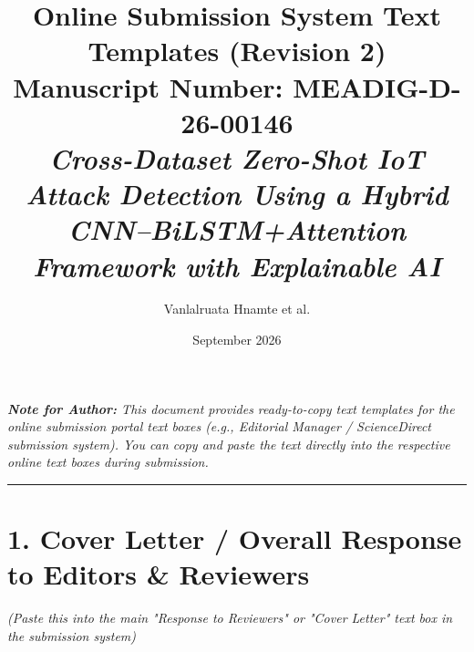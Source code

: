 \documentclass[11pt]{article}
\title{\textbf{Online Submission System Text Templates (Revision 2)}\\
\large Manuscript Number: MEADIG-D-26-00146\\
\small \textit{Cross-Dataset Zero-Shot IoT Attack Detection Using a Hybrid CNN--BiLSTM+Attention Framework with Explainable AI}}
\author{Vanlalruata Hnamte et al.}
\date{September 2026}
\begin{document}
\maketitle

\noindent
\textit{\textbf{Note for Author:} This document provides ready-to-copy text templates for the online submission portal text boxes (e.g., Editorial Manager / ScienceDirect submission system). You can copy and paste the text directly into the respective online text boxes during submission.}

\vspace{1em}
\hrule
\vspace{1.5em}

\section*{1. Cover Letter / Overall Response to Editors \& Reviewers}
\textit{(Paste this into the main "Response to Reviewers" or "Cover Letter" text box in the submission system)}
\end{document}
